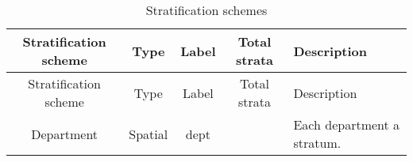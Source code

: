 \documentclass[11pt,]{article}
\begin{document}
\begin{longtable}[]{@{}ccccl@{}}
\caption{Stratification schemes}\tabularnewline
\toprule
\begin{minipage}[b]{0.17\columnwidth}\centering
Stratification scheme\strut
\end{minipage} & \begin{minipage}[b]{0.14\columnwidth}\centering
Type\strut
\end{minipage} & \begin{minipage}[b]{0.08\columnwidth}\centering
Label\strut
\end{minipage} & \begin{minipage}[b]{0.09\columnwidth}\centering
Total strata\strut
\end{minipage} & \begin{minipage}[b]{0.38\columnwidth}\raggedright
Description\strut
\end{minipage}\tabularnewline
\midrule
\endfirsthead
\toprule
\begin{minipage}[b]{0.17\columnwidth}\centering
Stratification scheme\strut
\end{minipage} & \begin{minipage}[b]{0.14\columnwidth}\centering
Type\strut
\end{minipage} & \begin{minipage}[b]{0.08\columnwidth}\centering
Label\strut
\end{minipage} & \begin{minipage}[b]{0.09\columnwidth}\centering
Total strata\strut
\end{minipage} & \begin{minipage}[b]{0.38\columnwidth}\raggedright
Description\strut
\end{minipage}\tabularnewline
\midrule
\endhead
\begin{minipage}[t]{0.17\columnwidth}\centering
Department\strut
\end{minipage} & \begin{minipage}[t]{0.14\columnwidth}\centering
Spatial\strut
\end{minipage} & \begin{minipage}[t]{0.08\columnwidth}\centering
dept\strut
\end{minipage} & \begin{minipage}[t]{0.09\columnwidth}\centering
14\strut
\end{minipage} & \begin{minipage}[t]{0.38\columnwidth}\raggedright
Each department a stratum.\strut
\end{minipage}\tabularnewline

\end{longtable}
\end{document}
